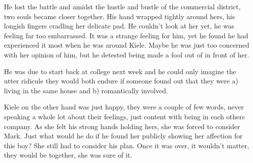 He lost the battle and amidst the hustle and bustle of the commercial district, two souls became closer together.  His hand wrapped tightly around hers, his longish fingers cradling her delicate pad.  He couldn't look at her yet, he was feeling far too embarrassed.  It was a strange feeling for him, yet he found he had experienced it most when he was around Kiele.  Maybe he was just too concerned with her opinion of him, but he detested being made a fool out of in front of her.  

He was due to start back at college next week and he could only imagine the utter ridicule they would both endure if someone found out that they were a) living in the same house and b) romantically involved.  

Kiele on the other hand was just happy, they were a couple of few words, never speaking a whole lot about their feelings, just content with being in each others company.  As she felt his strong hands holding hers, she was forced to consider Mark.  Just what would he do if he found her publicly showing her affection for this boy?  She still had to consider his plan.  Once it was over, it wouldn't matter, they would be together, she was sure of it.



